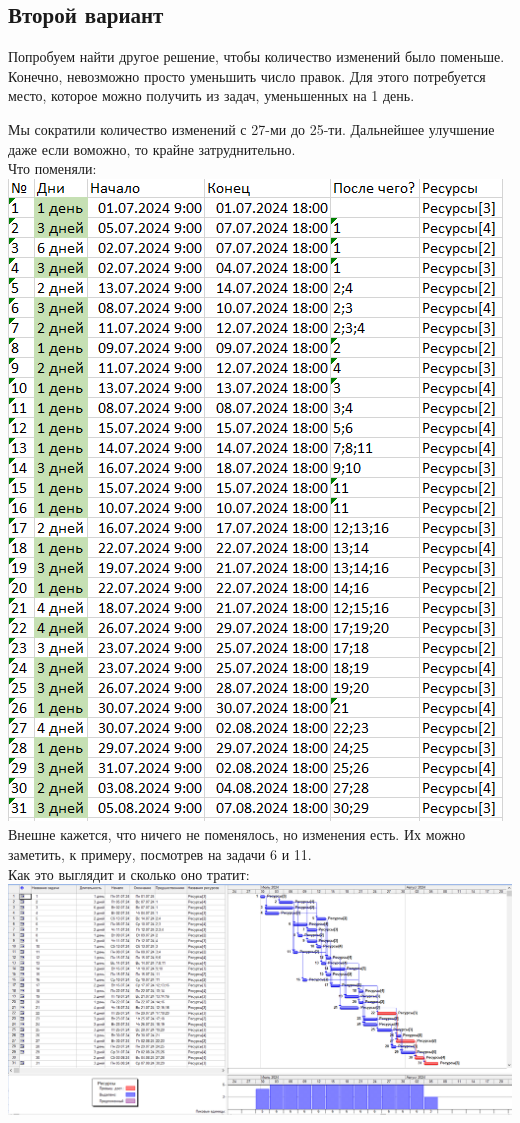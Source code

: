 \documentclass[14pt]{article}
\begin{document}
	\subsection{Второй вариант}
		Попробуем найти другое решение, чтобы количество изменений было поменьше.
		Конечно, невозможно просто уменьшить число правок.
		Для этого потребуется место, которое можно получить из задач, уменьшенных на 1 день.
		
		Мы сократили количество изменений с 27-ми до 25-ти.
		Дальнейшее улучшение даже если воможно, то крайне затруднительно.\\
		{\LARGE Что поменяли:}\\
		\includegraphics[height=0.6\textheight]{../img/1a2_days_change.png}\\ 
		Внешне кажется, что ничего не поменялось, но изменения есть.
		Их можно заметить, к примеру, посмотрев на задачи 6 и 11.\\
		{\LARGE Как это выглядит и сколько оно тратит:}\\
		\includegraphics[width=\textwidth]{../img/1a2_answer.png}\\ 
\end{document}
